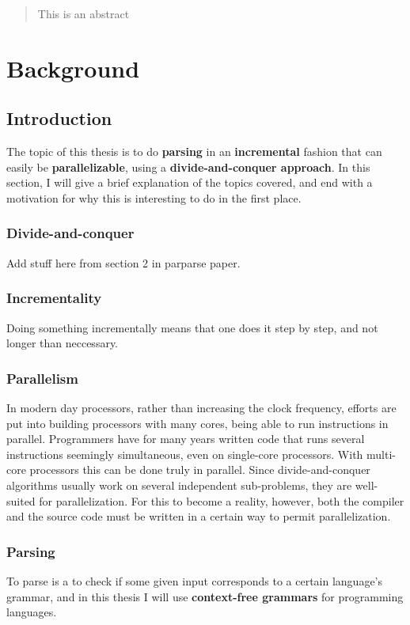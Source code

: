 \documentclass[a4paper,12pt,twosided]{report}
\begin{document}


\begin{abstract}
This is an abstract
\end{abstract}

\tableofcontents

%
%

\chapter{Background}

\section{Introduction}
The topic of this thesis is to do \textbf{parsing} in an \textbf{incremental}
fashion that can easily be \textbf{parallelizable}, using a
\textbf{divide-and-conquer approach}. In this section, I will give a brief
explanation of the topics covered, and end with a motivation for why this is
interesting to do in the first place.

\subsection{Divide-and-conquer}
Add stuff here from section 2 in parparse paper.

\subsection{Incrementality}
Doing something incrementally means that one does it step by step, and not
longer than neccessary.

\subsection{Parallelism}
In modern day processors, rather than increasing the clock frequency, efforts are
put into building processors with many cores, being able to run instructions in
parallel. Programmers have for many years written code that runs several
instructions seemingly simultaneous, even on single-core processors. With
multi-core processors this can be done truly in parallel. Since divide-and-conquer
algorithms usually work on several independent sub-problems, they are
well-suited for parallelization. For this to become a reality, however, both the
compiler and the source code must be written in a certain way to permit
parallelization.

\subsection{Parsing}
To parse is a to check if some given input corresponds to a certain language's
grammar, and in this thesis I will use \textbf{context-free grammars} for
programming languages.
\end{document}
